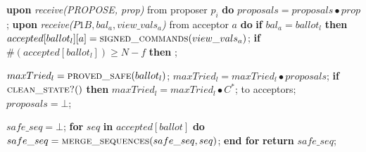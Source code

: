 \begin{algorithm}
\begin{algorithmic}[1]
		\State
		\State \textbf{upon} \textit{receive(PROPOSE, prop)} from proposer $p_i$ \textbf{do} 
		\State \hspace{\algorithmicindent} $proposals = proposals \bullet prop$;
		\State
		\State \textbf{upon} \textit{receive($P1B, bal_a,view\_vals_a$)} from acceptor $a$ \textbf{do}
		\State \hspace{\algorithmicindent} \textbf{if} $bal_a = ballot_l$ \textbf{then}
		\State \hspace{\algorithmicindent}\hspace{\algorithmicindent} $accepted[ballot_l][a] = \Call{signed\_commands}{view\_vals_a}$;
		\State
		\State \hspace{\algorithmicindent}\hspace{\algorithmicindent} \textbf{if} $\#(accepted[ballot_l]) \geq N-f$ \textbf{then} 
		\State \hspace{\algorithmicindent}\hspace{\algorithmicindent}\hspace{\algorithmicindent} ;
		
		\State
		\State $maxTried_l = \Call{proved\_safe}{ballot_l}$;
		\State $maxTried_l = maxTried_l \bullet proposals$;
		\State \textbf{if} $\Call{clean\_state?}{ }$ \textbf{then}
		\State \hspace{\algorithmicindent} $maxTried_l = maxTried_l \bullet C^*$;
		\State {} to acceptors;
		\State $proposals = \bot$;
		\EndFunction
		
		\State
		\State $safe\_seq = \bot$;
		\State \textbf{for} $seq$ \textbf{in} $accepted[ballot]$ \textbf{do}
		\State \hspace{\algorithmicindent} $safe\_seq = \Call{merge\_sequences}{safe\_seq, seq}$;
		\State \textbf{end for}
		\State \textbf{return} $safe\_seq$;
		\EndFunction		
	\end{algorithmic}
\end{algorithm}


